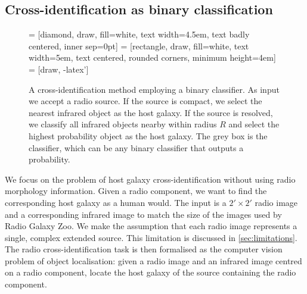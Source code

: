 \documentclass[fleqn,usenatbib,usedcolumn]{mnras}
\begin{document}
  \subsection{Cross-identification as binary
  classification}\label{cross-identification-as-binary-classification}
    \begin{figure}
      \centering
       = [diamond, draw, fill=white,
          text width=4.5em, text badly centered, inner sep=0pt]
       = [rectangle, draw, fill=white,
          text width=5em, text centered, rounded corners, minimum height=4em]
       = [draw, -latex']
      \caption{A cross-identification method employing a binary classifier. As
        input we accept a radio source. If the source is compact, we select
        the nearest infrared object as the host galaxy. If the source is
        resolved, we classify all infrared objects nearby within radius $R$
        and select the highest probability object as the host galaxy. The grey
        box is the classifier, which can be any binary classifier that outputs
        a probability.}
      \label{fig:flowchart}
    \end{figure}

    We focus on the problem of host galaxy cross-identification without using
    radio morphology information. Given a radio component, we want to find the
    corresponding host galaxy as a human would. The input is a $2' \times 2'$
    radio image and a corresponding infrared image to match the size of the
    images used by Radio Galaxy Zoo. We make the assumption that each radio
    image represents a single, complex extended source. This limitation is
    discussed in \autoref{sec:limitations}. The radio cross-identification
    task is then formalised as the computer vision problem of object localisation: given a radio
    image and an infrared image centred on a radio component, locate the host
    galaxy of the source containing the radio component.
\end{document}
